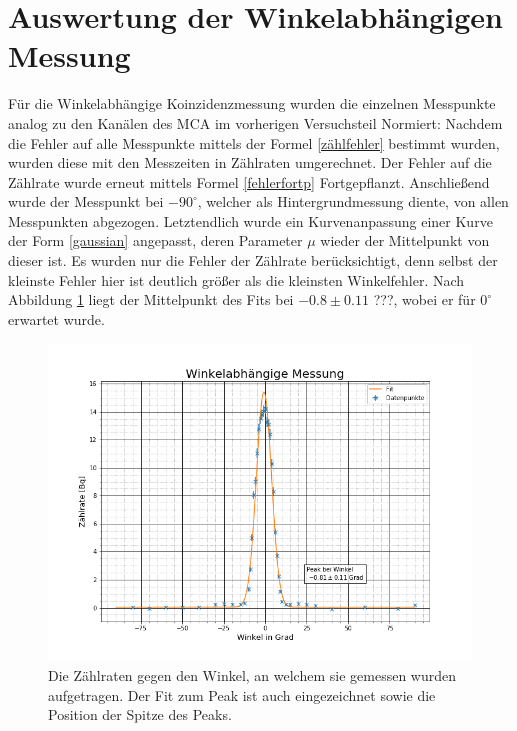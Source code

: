 \section{Auswertung der Winkelabhängigen Messung}
Für die Winkelabhängige Koinzidenzmessung wurden die einzelnen Messpunkte analog zu den Kanälen des MCA im vorherigen Versuchsteil Normiert:
Nachdem die Fehler auf alle Messpunkte mittels der Formel \ref{zählfehler} bestimmt wurden, wurden diese mit den Messzeiten in Zählraten umgerechnet. Der Fehler auf die Zählrate wurde erneut mittels Formel \ref{fehlerfortp} Fortgepflanzt. Anschließend wurde der Messpunkt bei $-90^\circ$, welcher als Hintergrundmessung diente, von allen Messpunkten abgezogen.
Letztendlich wurde ein Kurvenanpassung einer Kurve der Form \ref{gaussian} angepasst, deren Parameter $\mu$ wieder der Mittelpunkt von dieser ist. Es wurden nur die Fehler der Zählrate berücksichtigt, denn selbst der kleinste Fehler hier ist deutlich größer als die kleinsten Winkelfehler. Nach Abbildung \ref{Winkelbild} liegt der Mittelpunkt des Fits bei $-0.8\pm0.11$ ???, wobei er für $0^\circ$ erwartet wurde. 

\begin{figure}[h]
	\centering
	\includegraphics[scale=0.7]{Bilder/Winkel}
	\caption[Winkelmessung]{\small Die Zählraten gegen den Winkel, an welchem sie gemessen wurden aufgetragen. Der Fit zum Peak ist auch eingezeichnet sowie die Position der Spitze des Peaks.}
	\label{Winkelbild}
\end{figure}
